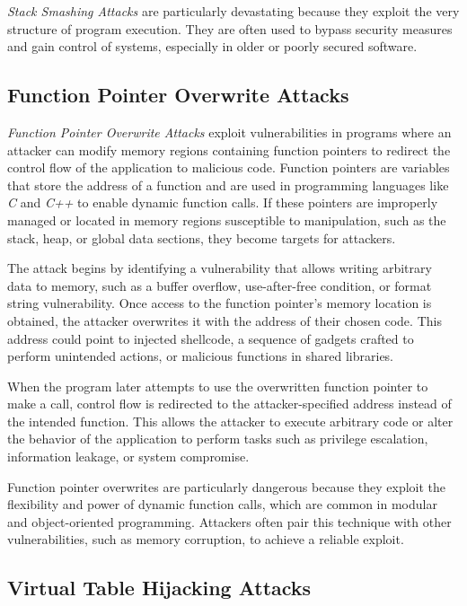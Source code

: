 \textit{Stack Smashing Attacks} are particularly devastating because they exploit
the very structure of program execution. They are often used to bypass security
measures and gain control of systems, especially in older or poorly secured software.

\subsection{Function Pointer Overwrite Attacks}
\label{subsec:background_pointeroverwrite}

\textit{Function Pointer Overwrite Attacks} exploit vulnerabilities in programs where
an attacker can modify memory regions containing function pointers to redirect the
control flow of the application to malicious code. Function pointers are
variables that store the address of a function and are used in programming
languages like \textit{C} and \textit{C++} to enable dynamic function calls. If these
pointers are improperly managed or located in memory regions susceptible to manipulation,
such as the stack, heap, or global data sections, they become targets for attackers.

The attack begins by identifying a vulnerability that allows writing arbitrary data
to memory, such as a buffer overflow, use-after-free condition, or format string
vulnerability. Once access to the function pointer's memory location is obtained,
the attacker overwrites it with the address of their chosen code. This address could
point to injected shellcode, a sequence of gadgets crafted to perform unintended
actions, or malicious functions in shared libraries.

When the program later attempts to use the overwritten function pointer to make a
call, control flow is redirected to the attacker-specified address instead of
the intended function. This allows the attacker to execute arbitrary code or alter
the behavior of the application to perform tasks such as privilege escalation,
information leakage, or system compromise.

Function pointer overwrites are particularly dangerous because they exploit the flexibility
and power of dynamic function calls, which are common in modular and object-oriented
programming. Attackers often pair this technique with other vulnerabilities,
such as memory corruption, to achieve a reliable exploit.

\subsection{Virtual Table Hijacking Attacks}
\label{subsec:background_virtualtable}

